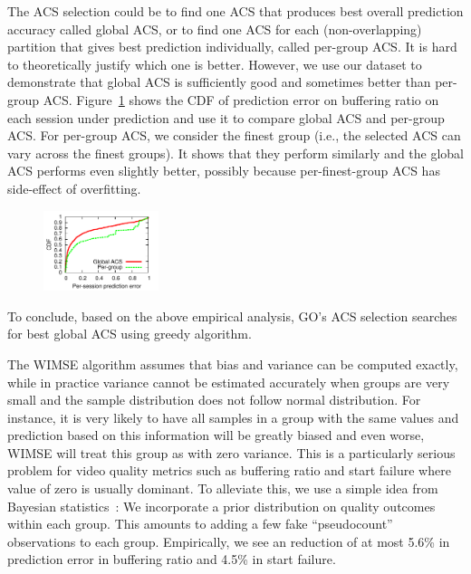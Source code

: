  The ACS selection could be to find one ACS that produces best overall prediction accuracy called global ACS, or to find one ACS for each (non-overlapping) partition that gives best prediction individually, called per-group ACS. 
It is hard to theoretically justify which one is better. However, we use our dataset to demonstrate that global ACS is sufficiently good and sometimes better than per-group ACS.
Figure~\ref{fig:global-acs} shows the CDF of prediction error on buffering ratio on each session under prediction and use it to compare global ACS and per-group ACS. For per-group ACS, we consider the finest group (i.e., the selected ACS can vary across the finest groups). It shows that they perform similarly and the global ACS performs even slightly better, possibly because per-finest-group ACS has side-effect of overfitting.

\begin{figure}[h!]
\centering
 \includegraphics[width=0.3\textwidth] {figures/newfig/example-granular-metric0-new.pdf}
\label{fig:global-acs}
\end{figure}

To conclude, based on the above empirical analysis, GO's ACS selection searches for best global ACS using greedy algorithm. 

\label{subsec:sudo}
The WIMSE algorithm assumes that bias and variance can be computed exactly, while in practice variance cannot be estimated accurately when groups are very small and the sample distribution does not follow normal distribution. For instance, it is very likely to have all samples in a group with the same values and prediction based on this information will be greatly biased and even worse, WIMSE will treat this group as with zero variance. This is a particularly serious problem for video quality metrics such as buffering ratio and start failure where value of zero is usually dominant.
To alleviate this, we use a simple idea from Bayesian statistics~\cite{flach2012machine}: We incorporate a prior distribution on quality outcomes within each group.  This amounts to adding a few fake ``pseudocount'' observations to each group.  Empirically, we see an reduction of at most 5.6\% in prediction error in buffering ratio and 4.5\% in start failure.

